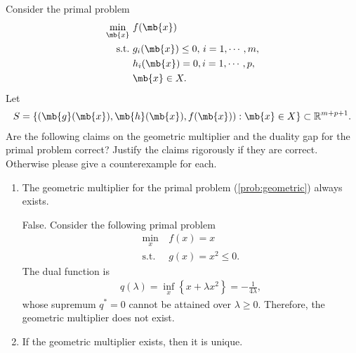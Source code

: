 \begin{exercise}

    Consider the primal problem
    \begin{align}\label{prob:geometric}
        \min _{\mb{x}}\  & f(\mb{x})                               \\ \nonumber
        \text{s.t.}\     & g_{i}(\mb{x}) \leq 0,\, i=1, \cdots, m, \\ \nonumber
                         & h_{i}(\mb{x})=0, i=1, \cdots, p,        \\ \nonumber
                         & \mb{x} \in X.
    \end{align}
    Let
    \begin{align}\label{def:image-set}
        S=\{(\mb{g}(\mb{x}),\mb{h}(\mb{x}),f(\mb{x})):\mb{x}\in X\}\subset\mathbb{R}^{m+p+1}.
    \end{align}
    Are the following claims on the geometric multiplier and the duality gap for the primal problem correct? Justify the claims rigorously if they are correct. Otherwise please give a counterexample for each.
    \begin{enumerate}
        \item The geometric multiplier for the primal problem (\ref{prob:geometric}) always exists.

            \begin{solution}
                False. Consider the following primal problem
                \begin{align*}
                    \min_x\       & f(x) = x          \\
                    \text{s.t.}\  & g(x) = x^2 \le 0.
                \end{align*}
                The dual function is
                \begin{align*}
                    q(\lambda) = \inf_{x} \left\{ x + \lambda x^2 \right\} = -\frac{1}{4\lambda},
                \end{align*}
                whose supremum $q^* = 0$ cannot be attained over $\lambda \ge 0$. Therefore, the geometric multiplier does not exist.
            \end{solution}

        \item If the geometric multiplier exists, then it is unique.


\end{enumerate}
\end{exercise}
